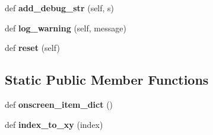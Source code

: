 \begin{DoxyCompactItemize}
def {\bfseries add\+\_\+debug\+\_\+str} (self, s)
\item 
\mbox{\label{classfeature__extractors_1_1_lakeland_extractor_1_1_lakeland_extractor_a84cb04bc896096776732bd18fdd9c9a7}} 
def {\bfseries log\+\_\+warning} (self, message)
\item 
\mbox{\label{classfeature__extractors_1_1_lakeland_extractor_1_1_lakeland_extractor_afa6b73b54b2c7a79f20b4ea3a01bcadb}} 
def {\bfseries reset} (self)
\end{DoxyCompactItemize}
\subsection*{Static Public Member Functions}
\begin{DoxyCompactItemize}
\item 
\mbox{\label{classfeature__extractors_1_1_lakeland_extractor_1_1_lakeland_extractor_a8d63cba4024fedd6cf732480c4fdfcb4}} 
def {\bfseries onscreen\+\_\+item\+\_\+dict} ()
\item 
\mbox{\label{classfeature__extractors_1_1_lakeland_extractor_1_1_lakeland_extractor_a0d23b6bd8657447843741c39231ce6da}} 
def {\bfseries index\+\_\+to\+\_\+xy} (index)
\end{DoxyCompactItemize}
